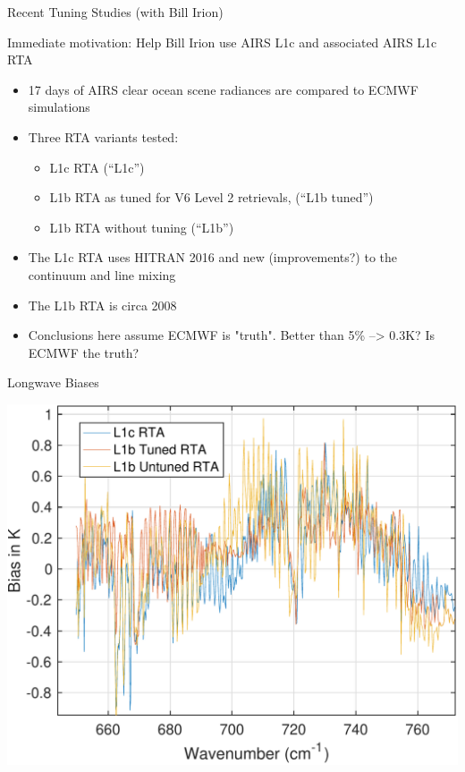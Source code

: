 \documentclass[10pt,t]{beamer}
\begin{document}





%

\begin{frame}[label={sec:org472f9d3}]{Recent Tuning Studies (with Bill Irion)}

Immediate motivation: Help Bill Irion use AIRS L1c and associated AIRS L1c RTA

\begin{itemize}
\item 17 days of AIRS clear ocean scene radiances are compared to ECMWF simulations
\item Three RTA variants tested:
\begin{itemize}
\item L1c RTA  (``L1c'')
\item L1b RTA as tuned for V6 Level 2 retrievals, (``L1b tuned'')
\item L1b RTA without tuning  (``L1b'')
\end{itemize}
\item The L1c RTA uses HITRAN 2016 and new (improvements?) to the continuum and line mixing
\item The L1b RTA is circa 2008
\item Conclusions here assume ECMWF is "truth".  Better than 5\% --> 0.3K?  Is ECMWF the truth?
\end{itemize}
\end{frame}

\begin{frame}[label={sec:orgf207f3e}]{Longwave Biases}
\begin{center}
\includegraphics[width=0.75\linewidth]{./Talk2/bias_3rta_lw.pdf}
\end{center}
\end{frame}
\end{document}
